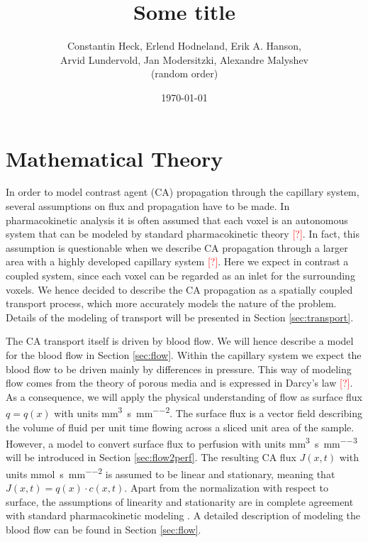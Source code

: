 \documentclass[paper=a4, fontsize=12pt,parskip=half, draft, headings=small]{scrartcl}
\title{Some title}
\author{Constantin Heck, Erlend Hodneland, Erik A. Hanson, \\ Arvid Lundervold, Jan Modersitzki, Alexandre Malyshev \\ (random order)}
\date{\today}
\newcommand{\siq}{\cubic\milli\meter\per\second\per\square\milli\meter}
\newcommand{\siP}{\cubic\milli\meter\per\second\per\cubic\milli\meter}
\newcommand{\siJ}{\milli\mol\per\second\per\square\milli\meter}
\newcommand{\missingsource}{\textcolor{red}{[?]}}
\begin{document}


	\section{Mathematical Theory} \label{sec:maththeory}
		
	In order to model contrast agent (CA) propagation through the capillary system, several assumptions on flux and propagation have to be made.
	In pharmacokinetic analysis it is often assumed that each voxel is an autonomous system that can be modeled by standard pharmacokinetic theory \missingsource.
	In fact, this assumption is questionable when we describe CA propagation through a larger area with a highly developed capillary system \missingsource.
	Here we expect in contrast a coupled system, since each voxel can be regarded as an inlet for the surrounding voxels.
	We hence decided to describe the CA propagation as a spatially coupled transport process, which more accurately models the nature of the problem. 
	Details of the modeling of transport will be presented in Section \ref{sec:transport}.
	
	The CA transport itself is driven by blood flow. 
	We will hence describe a model for the blood flow in Section \ref{sec:flow}.
	Within the capillary system we expect the blood flow to be driven mainly by differences in pressure.
	This way of modeling flow comes from the theory of porous media and is expressed in Darcy's law \missingsource.
	As a consequence, we will apply the physical understanding of flow as surface flux $q = q(x)$ with units \si{\siq}.
	The surface flux is a vector field describing the volume of fluid per unit time flowing across a sliced unit area of the sample.	
	However, a model to convert surface flux to perfusion with units \si{\siP} will be introduced in Section \ref{sec:flow2perf}.
	The resulting CA flux $J(x,t)$ with units \si{\siJ} is assumed to be linear and stationary, meaning that $J(x,t) = q(x)\cdot c(x,t)$.
	Apart from the normalization with respect to surface, the assumptions of linearity and stationarity are in complete agreement with standard pharmacokinetic modeling \cite{sourbron13}.
	A detailed description of modeling the blood flow can be found in Section \ref{sec:flow}.
	
\end{document}
